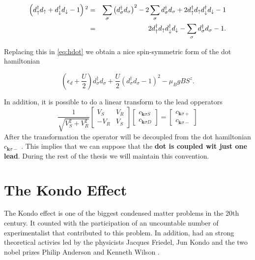 \begin{eqnarray*}
\left(d_{\uparrow}^{\dagger}d_{\uparrow}+d_{\downarrow}^{\dagger}d_{\downarrow}-1\right){}^{2} & = & \sum_{\sigma}\left(d_{\sigma}^{\dagger}d_{\sigma}\right)^{2}-2\sum_{\sigma}d_{\sigma}^{\dagger}d_{\sigma}+2d_{\uparrow}^{\dagger}d_{\uparrow}d_{\downarrow}^{\dagger}d_{\downarrow}-1\\
 & = & 2d_{\uparrow}^{\dagger}d_{\uparrow}d_{\downarrow}^{\dagger}d_{\downarrow}-\sum_{\sigma}d_{\sigma}^{\dagger}d_{\sigma}-1.
\end{eqnarray*}

Replacing this in \eqref{eq:hdot} we obtain a  nice spin-symmetric form of the dot hamiltonian

\begin{equation}
    \left(\epsilon_{d}+\frac{U}{2}\right)d_{\sigma}^{\dagger}d_{\sigma}+\frac{U}{2}(d_{\sigma}^{\dagger}d_{\sigma}-1)^{2}-\mu_{B}gBS^{z}. 
    \label{eq:hdot2}
\end{equation}

In addition, it is possible to do a linear transform to the lead opperators 
\begin{equation}
    \frac{1}{\sqrt{V_{S}^{2}+V_{R}^{2}}}\left[\begin{array}{cc}
V_{S} & V_{R}\\
-V_{R} & V_{S}
\end{array}\right]\left[\begin{array}{c}
c_{\mathbf{k}\sigma S}\\
c_{\mathbf{k}\sigma D}
\end{array}\right]=\left[\begin{array}{c}
c_{\mathbf{k}\sigma+}\\
c_{\mathbf{k}\sigma-}
\end{array}\right]
\end{equation}
After the transformation the operator will be decoupled from the dot hamiltonian $c_{\mathbf{k}\sigma-}$ . This implies that we can suppose that the  \textbf{dot is coupled wit just one lead}. During the rest of the thesis we will maintain this convention. 


\section{The Kondo Effect \label{sec:Kondo} }


The Kondo effect is one of the biggest condensed matter problems in the 20th century. It counted with the participation of an uncountable number of experimentalist that contributed to this problem. In addition, had an strong theoretical activies led by the physicists Jacques Friedel, Jun Kondo and the two nobel prizes Philip Anderson and Kenneth Wilson \citep{hewson_kondo_1997}. 


